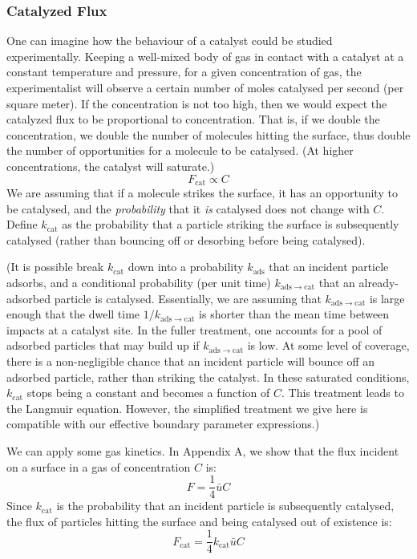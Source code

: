 \documentclass[12pt, a4paper, twoside, openright]{book}
\newcommand{\Fcat}{\ensuremath{F_{\mathrm{cat}}}}
\newcommand{\kcat}{\ensuremath{k_{\mathrm{cat}}}}
\newcommand{\kads}{\ensuremath{k_{\mathrm{ads}}}}
\newcommand{\kadscat}{\ensuremath{k_{\mathrm{ads \to cat}}}}
\begin{document}
\subsubsection{Catalyzed Flux}

One can imagine how the behaviour of a catalyst could be studied experimentally.
Keeping a well-mixed body of gas in contact with a catalyst at a constant temperature and pressure, for a given concentration of gas, the experimentalist will observe a certain number of moles catalysed per second (per square meter).  If the concentration is not too high, then we would expect the catalyzed flux to be proportional to concentration. That is, if we double the concentration, we double the number of molecules hitting the surface, thus double the number of opportunities for a molecule to be catalysed.  (At higher concentrations, the catalyst will saturate.)
\begin{equation}
\Fcat \propto C 
\end{equation}
We are assuming that if a molecule strikes the surface, it has an opportunity to be catalysed, and the \emph{probability} that it \emph{is} catalysed does not change with $C$.  Define $\kcat$ as the probability that a particle striking the surface is subsequently catalysed (rather than bouncing off or desorbing before being catalysed).

(It is possible break $\kcat$ down into a probability $\kads$ that an incident particle adsorbs, and a conditional probability (per unit time) $\kadscat$ that an already-adsorbed particle is catalysed. Essentially, we are assuming that $\kadscat$ is large enough that the dwell time $1/ \kadscat$ is shorter than the mean time between impacts at a catalyst site. In the fuller treatment, one accounts for a pool of adsorbed particles that may build up if $\kadscat$ is low.
At some level of coverage, there is a non-negligible chance that an incident particle will bounce off an adsorbed particle, rather than striking the catalyst.  In these saturated conditions, $\kcat$ stops being a constant and becomes a function of $C$.
This treatment leads to the Langmuir equation.  However, the simplified treatment we give here is compatible with our effective boundary parameter expressions.)

We can apply some gas kinetics.  In Appendix A, we show that the flux incident on a surface in a gas of concentration $C$ is:
\begin{equation}
F = \frac{1}{4} \bar{u} C
\end{equation}
Since $\kcat$ is the probability that an incident particle is subsequently catalysed, the flux of particles hitting the surface and being catalysed out of existence is:
\begin{equation}
\Fcat = \frac{1}{4} \kcat \bar{u} C
\end{equation}
\end{document}
